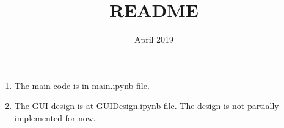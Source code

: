 \documentclass{article}
\title{README}
\date{April 2019}
\begin{document}
\maketitle
\thispagestyle{empty}

\begin{enumerate}
    \item The main code is in main.ipynb file.
    \item The GUI design is at GUIDesign.ipynb file. The design is not partially implemented for now.
\end{enumerate}
\end{document}
